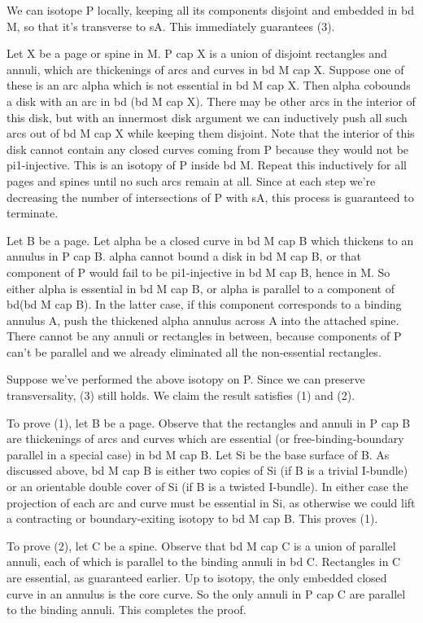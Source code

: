 We can isotope P locally, keeping all its components disjoint and embedded in
bd M, so that it's transverse to sA. This immediately guarantees (3).

Let X be a page or spine in M. P cap X is a union of disjoint rectangles and
annuli, which are thickenings of arcs and curves in bd M cap X. Suppose one of
these is an arc alpha which is not essential in bd M cap X. Then alpha cobounds
a disk with an arc in bd (bd M cap X). There may be other arcs in the interior
of this disk, but with an innermost disk argument we can inductively push all
such arcs out of bd M cap X while keeping them disjoint. Note that the interior
of this disk cannot contain any closed curves coming from P because they would
not be pi1-injective. This is an isotopy of P inside bd M.  Repeat this
inductively for all pages and spines until no such arcs remain at all.  Since
at each step we're decreasing the number of intersections of P with sA, this
process is guaranteed to terminate.

Let B be a page. Let alpha be a closed curve in bd M cap B which thickens to an
annulus in P cap B. alpha cannot bound a disk in bd M cap B, or that component
of P would fail to be pi1-injective in bd M cap B, hence in M. So either alpha
is essential in bd M cap B, or alpha is parallel to a component of bd(bd M cap
B). In the latter case, if this component corresponds to a binding annulus A,
push the thickened alpha annulus across A into the attached spine. There cannot
be any annuli or rectangles in between, because components of P can't be
parallel and we already eliminated all the non-essential rectangles.

Suppose we've performed the above isotopy on P. Since we can preserve
transversality, (3) still holds. We claim the result satisfies (1) and (2).

To prove (1), let B be a page. Observe that the rectangles and annuli in P cap
B are thickenings of arcs and curves which are essential (or
free-binding-boundary parallel in a special case) in bd M cap B. Let Si be the
base surface of B. As discussed above, bd M cap B is either two copies of Si
(if B is a trivial I-bundle) or an orientable double cover of Si (if B is
a twisted I-bundle). In either case the projection of each arc and curve must
be essential in Si, as otherwise we could lift a contracting or
boundary-exiting isotopy to bd M cap B. This proves (1).

To prove (2), let C be a spine. Observe that bd M cap C is a union of parallel
annuli, each of which is parallel to the binding annuli in bd C. Rectangles in
C are essential, as guaranteed earlier. Up to isotopy, the only embedded closed
curve in an annulus is the core curve. So the only annuli in P cap C are
parallel to the binding annuli. This completes the proof.

